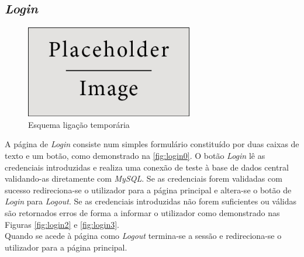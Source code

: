 \documentclass[11pt,twoside,a4paper]{report}
\begin{document}
\subsection{\textit{Login}}
\begin{figure}[H]
	\begin{center}
		\includegraphics[width=0.65\textwidth]{placeholder} %
		\caption{Esquema ligação temporária}
		\label{fig:login0}
	\end{center}
\end{figure}
A página de \textit{Login} consiste num simples formulário constituído por duas caixas de texto e um botão, como demonstrado na \autoref*{fig:login0}. O botão \textit{Login} lê as credenciais introduzidas e realiza uma conexão de teste à base de dados central validando-as diretamente com \textit{MySQL}. Se as credenciais forem validadas com sucesso redireciona-se o utilizador para a página principal e altera-se o botão de \textit{Login} para \textit{Logout}. Se as credenciais introduzidas não forem suficientes ou válidas são retornados erros de forma a informar o utilizador como demonstrado nas Figuras \ref{fig:login2} e \ref{fig:login3}.\\
Quando se acede à página como \textit{Logout} termina-se a sessão e redireciona-se o utilizador para a página principal.
\end{document}
